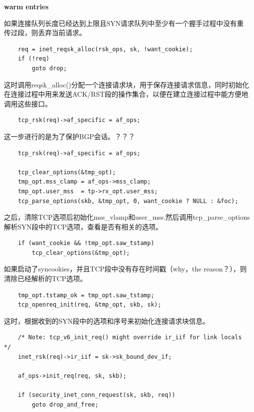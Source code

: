 \documentclass[11pt, a4paper,oneside]{book}
\theoremstyle{ocrenumbox}
\theoremstyle{purplenumbox}
\theoremstyle{blackbox}
\begin{document}
		\textbf{warm entries}        		
		
		如果连接队列长度已经达到上限且SYN请求队列中至少有一个握手过程中没有重传过段，则丢弃当前请求。

\begin{verbatim}
	req = inet_reqsk_alloc(rsk_ops, sk, !want_cookie);
	if (!req)
		goto drop;
\end{verbatim}
        	
		这时调用reqsk\_alloc()分配一个连接请求块，用于保存连接请求信息，同时初始化在连接过程中用来发送ACK/RST段的操作集合，以便在建立连接过程中能方便地调用这些接口。

\begin{verbatim}
	tcp_rsk(req)->af_specific = af_ops;
\end{verbatim}

		这一步进行的是为了保护BGP会话。？？？
		
\begin{verbatim}
	tcp_rsk(req)->af_specific = af_ops;

	tcp_clear_options(&tmp_opt);
	tmp_opt.mss_clamp = af_ops->mss_clamp;
	tmp_opt.user_mss  = tp->rx_opt.user_mss;
	tcp_parse_options(skb, &tmp_opt, 0, want_cookie ? NULL : &foc);
\end{verbatim}

		之后，清除TCP选项后初始化mss\_vlamp和user\_mss.然后调用tcp\_parse\_options解析SYN段中的TCP选项，查看是否有相关的选项。
\begin{verbatim}
	if (want_cookie && !tmp_opt.saw_tstamp)
		tcp_clear_options(&tmp_opt);
\end{verbatim}

		如果启动了syncookies，并且TCP段中没有存在时间戳（why，the reason？），则清除已经解析的TCP选项。

\begin{verbatim}
	tmp_opt.tstamp_ok = tmp_opt.saw_tstamp;
	tcp_openreq_init(req, &tmp_opt, skb, sk);
\end{verbatim}

		这时，根据收到的SYN段中的选项和序号来初始化连接请求块信息。

\begin{verbatim}
	/* Note: tcp_v6_init_req() might override ir_iif for link locals */
	inet_rsk(req)->ir_iif = sk->sk_bound_dev_if;

	af_ops->init_req(req, sk, skb);

	if (security_inet_conn_request(sk, skb, req))
		goto drop_and_free;
\end{verbatim}
\end{document}
